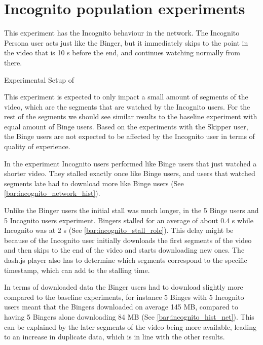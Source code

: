\if{}

\fi
 
\FloatBarrier \section{Incognito population experiments}
\label{sec:eval_incognito}
This experiment has the Incognito behaviour in the network.
The Incognito Persona user acts just like the Binger, but it immediately skips to the point in the video that is 10 \ac{s} before the end, and continues watching normally from there.

\begin{table}[!htbp]
    \myfloatalign
    \caption[Experimental Setup of Incognito]{Experimental Setup of }
    \label{tab:exp_overview_incognito}
    
\end{table}

This experiment is expected to only impact a small amount of segments of the video, which are the segments that are watched by the Incognito users.
For the rest of the segments we should see similar results to the baseline experiment with equal amount of Binge users. Based on the experiments with the Skipper user, the Binge users are not expected to be affected by the Incognito user in terms of quality of experience.

In the experiment Incognito users performed like Binge users that just watched a shorter video. They stalled exactly once like Binge users, and users that watched segments late had to download more like Binge users (See \autoref{bar:incognito_network_hist}). 

\if{}

\fi

Unlike the Binger users the initial stall was much longer, in the 5 Binge users and 5 Incognito users experiment. Bingers stalled for an average of about 0.4 \ac{s} while Incognito was at 2 \ac{s} (See \autoref{bar:incognito_stall_role}). This delay might be because of the Incognito user initially downloads the first segments of the video and then skips to the end of the video and starts downloading new ones. The dash.js player also has to determine which segments correspond to the specific timestamp, which can add to the stalling time.

\if{}

\fi

In terms of downloaded data the Binger users had to download slightly more compared to the baseline experiments, for instance 5 Binges with 5 Incognito users meant that the Bingers downloaded on average 145 \ac{MB}, compared to having 5 Bingers alone downloading 84 \ac{MB} (See \autoref{bar:incognito_hist_net}). This can be explained by the later segments of the video being more available, leading to an increase in duplicate data, which is in line with the other results.

